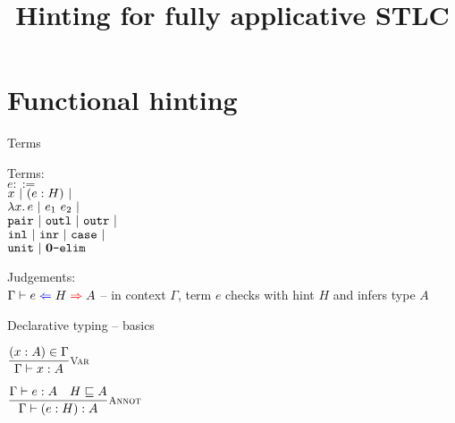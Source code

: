 \documentclass{beamer}
\title{Hinting for fully applicative STLC}
\date{}
\begin{document}
\frame{\titlepage}

\section{Functional hinting}

\begin{frame}{Terms}

Terms: \\
$e ::=$ \\
\qquad $x \ |\  (e : H) \ |\  $ \\
\qquad $\fun{x}{e} \pipe \app{e_1}{e_2} \pipe$ \\
\qquad $\texttt{pair} \ |\  \texttt{outl} \ |\  \texttt{outr} \ |\ $ \\
\qquad $\texttt{inl} \ |\  \texttt{inr} \ |\  \texttt{case} \ |\ $ \\
\qquad $\texttt{unit} \ |\  \textbf{0}\texttt{-elim}$

\vspace{2em}

Judgements: \\
$\hinting[\Gamma]{e}{H}{A}$ -- in context $\Gamma$, term $e$ checks with hint $H$ and infers type $A$

\end{frame}

\begin{frame}{Declarative typing -- basics}

\begin{center}
  $\infrule[Var]{\sidecond{(x : A) \in \Gamma}}{\typing{x}{A}}$

  \vspace{2em}

  $\infrule[Annot]{\typing{e}{A} \quad \sidecond{\hintorder{H}{A}}}{\typing{\annot{e}{H}}{A}}$
\end{center}

\end{frame}
\end{document}
